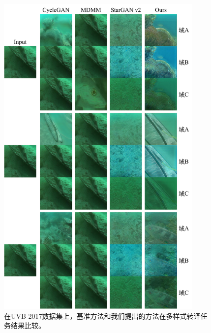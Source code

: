 \begin{figure}[htp]
    \centering
  \includegraphics[width=0.9\textwidth]{figures/comparison_ruie_domain.pdf}
  \caption{在UVB 2017数据集上，基准方法和我们提出的方法在多样式转译任务结果比较。}
  \label{fig:comparison_uvb_domain}
\end{figure}

